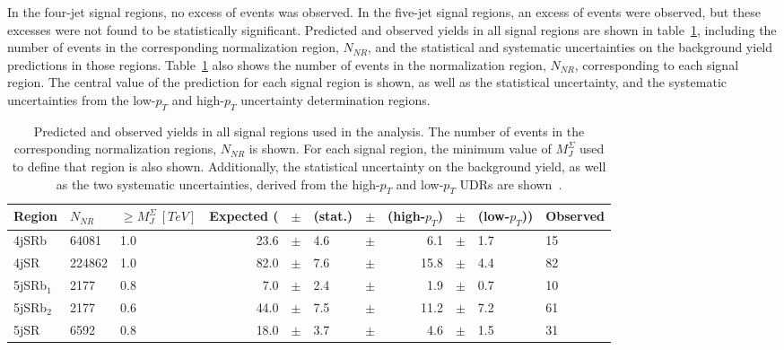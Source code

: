 In the four-jet signal regions, no excess of events was observed.
In the five-jet signal regions, an excess of events were observed, but these excesses were not found to be statistically significant.
Predicted and observed yields in all signal regions are shown in table~\ref{tbl:results_yields_table}, including the number of events in the corresponding normalization region, $N_{NR}$, and the statistical and systematic uncertainties on the background yield predictions in those regions.
Table~\ref{tbl:results_yields_table} also shows the number of events in the normalization region, $N_{NR}$, corresponding to each signal region.
The central value of the prediction for each signal region is shown, as well as the statistical uncertainty, and the systematic uncertainties from the low-$p_T$ and high-$p_T$ uncertainty determination regions.

\begin{table}[!ht]
    \centering

    \begin{tabular}{lllrlllrlll}
        \toprule
        Region & $N_{NR}$ & $\geq M_{J}^{\Sigma}~[TeV]$ & Expected ( & $\pm$ & (stat.) & $\pm$ & (high-$p_T$) & $\pm$ & (low-$p_T$)) & Observed \\
        \midrule
        4jSRb     & 64081    & 1.0                       & 23.6       & $\pm$ & 4.6     & $\pm$ & 6.1          & $\pm$ & 1.7          & 15 \\
        4jSR      & 224862   & 1.0                       & 82.0       & $\pm$ & 7.6     & $\pm$ & 15.8         & $\pm$ & 4.4          & 82 \\
        5jSRb$_1$ & 2177     & 0.8                       & 7.0        & $\pm$ & 2.4     & $\pm$ & 1.9          & $\pm$ & 0.7          & 10 \\
        5jSRb$_2$ & 2177     & 0.6                       & 44.0       & $\pm$ & 7.5     & $\pm$ & 11.2         & $\pm$ & 7.2          & 61 \\
        5jSR      & 6592     & 0.8                       & 18.0       & $\pm$ & 3.7     & $\pm$ & 4.6          & $\pm$ & 1.5          & 31 \\
        \bottomrule
    \end{tabular}

\caption{Predicted and observed yields in all signal regions used in the analysis.
The number of events in the corresponding normalization regions, $N_{NR}$ is shown.
For each signal region, the minimum value of $M_J^{\Sigma}$ used to define that region is also shown.
Additionally, the statistical uncertainty on the background yield, as well as the two systematic uncertainties,
derived from the high-$p_T$ and low-$p_T$ UDRs are shown~\cite{paper-plb}.}
\label{tbl:results_yields_table}
\end{table}

